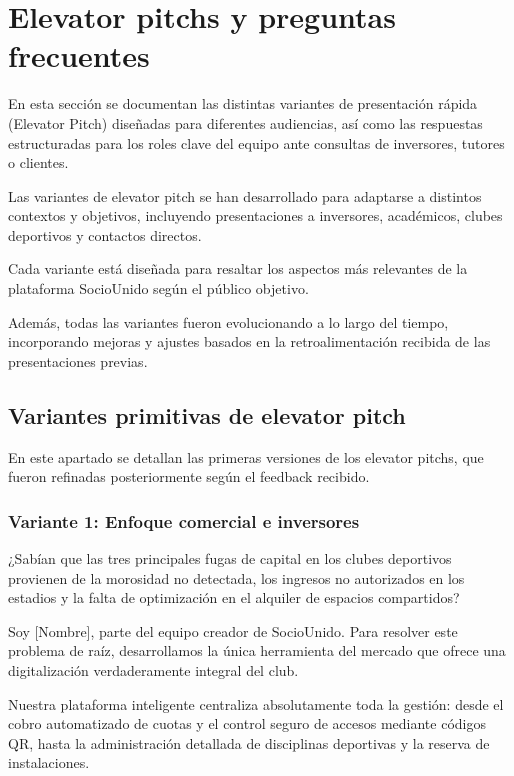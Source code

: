 \section{Elevator pitchs y preguntas frecuentes}

En esta sección se documentan las distintas variantes de presentación rápida (Elevator Pitch) diseñadas para diferentes audiencias, así como las respuestas estructuradas para los roles clave del equipo ante consultas de inversores, tutores o clientes.

Las variantes de elevator pitch se han desarrollado para adaptarse a distintos contextos y objetivos, incluyendo presentaciones a inversores, académicos, clubes deportivos y contactos directos.

Cada variante está diseñada para resaltar los aspectos más relevantes de la plataforma SocioUnido según el público objetivo.

Además, todas las variantes fueron evolucionando a lo largo del tiempo, incorporando mejoras y ajustes basados en la retroalimentación recibida de las presentaciones previas.

\subsection{Variantes primitivas de elevator pitch}

En este apartado se detallan las primeras versiones de los elevator pitchs, que fueron refinadas posteriormente según el feedback recibido.

\subsubsection{Variante 1: Enfoque comercial e inversores}

¿Sabían que las tres principales fugas de capital en los clubes deportivos provienen de la morosidad no detectada, los ingresos no autorizados en los estadios y la falta de optimización en el alquiler de espacios compartidos?

Soy [Nombre], parte del equipo creador de SocioUnido. Para resolver este problema de raíz, desarrollamos la única herramienta del mercado que ofrece una digitalización verdaderamente integral del club.

Nuestra plataforma inteligente centraliza absolutamente toda la gestión: desde el cobro automatizado de cuotas y el control seguro de accesos mediante códigos QR, hasta la administración detallada de disciplinas deportivas y la reserva de instalaciones.

